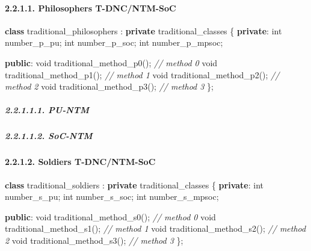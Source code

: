 \documentclass[
]{article}
\newenvironment{Shaded}{}{}
\newcommand{\CommentTok}[1]{\textcolor[rgb]{0.38,0.63,0.69}{\textit{#1}}}
\newcommand{\DataTypeTok}[1]{\textcolor[rgb]{0.56,0.13,0.00}{#1}}
\newcommand{\KeywordTok}[1]{\textcolor[rgb]{0.00,0.44,0.13}{\textbf{#1}}}
\newcommand{\NormalTok}[1]{#1}
\begin{document}
\hypertarget{philosophers-t-dncntm-soc}{%
\paragraph{2.2.1.1. Philosophers
T-DNC/NTM-SoC}\label{philosophers-t-dncntm-soc}}

\begin{Shaded}
\begin{Highlighting}[]
\KeywordTok{class}\NormalTok{ traditional\_philosophers : }\KeywordTok{private}\NormalTok{ traditional\_classes \{}
   \KeywordTok{private}\NormalTok{:}
      \DataTypeTok{int}\NormalTok{ number\_p\_pu;}
      \DataTypeTok{int}\NormalTok{ number\_p\_soc;}
      \DataTypeTok{int}\NormalTok{ number\_p\_mpsoc;}

   \KeywordTok{public}\NormalTok{:}
      \DataTypeTok{void}\NormalTok{ traditional\_method\_p0();  }\CommentTok{// method 0}
      \DataTypeTok{void}\NormalTok{ traditional\_method\_p1();  }\CommentTok{// method 1}
      \DataTypeTok{void}\NormalTok{ traditional\_method\_p2();  }\CommentTok{// method 2}
      \DataTypeTok{void}\NormalTok{ traditional\_method\_p3();  }\CommentTok{// method 3}
\NormalTok{\};}
\end{Highlighting}
\end{Shaded}

\hypertarget{pu-ntm}{%
\subparagraph{2.2.1.1.1. PU-NTM}\label{pu-ntm}}

\hypertarget{soc-ntm}{%
\subparagraph{2.2.1.1.2. SoC-NTM}\label{soc-ntm}}

\hypertarget{soldiers-t-dncntm-soc}{%
\paragraph{2.2.1.2. Soldiers
T-DNC/NTM-SoC}\label{soldiers-t-dncntm-soc}}

\begin{Shaded}
\begin{Highlighting}[]
\KeywordTok{class}\NormalTok{ traditional\_soldiers : }\KeywordTok{private}\NormalTok{ traditional\_classes \{}
   \KeywordTok{private}\NormalTok{:}
      \DataTypeTok{int}\NormalTok{ number\_s\_pu;}
      \DataTypeTok{int}\NormalTok{ number\_s\_soc;}
      \DataTypeTok{int}\NormalTok{ number\_s\_mpsoc;}

   \KeywordTok{public}\NormalTok{:}
      \DataTypeTok{void}\NormalTok{ traditional\_method\_s0();  }\CommentTok{// method 0}
      \DataTypeTok{void}\NormalTok{ traditional\_method\_s1();  }\CommentTok{// method 1}
      \DataTypeTok{void}\NormalTok{ traditional\_method\_s2();  }\CommentTok{// method 2}
      \DataTypeTok{void}\NormalTok{ traditional\_method\_s3();  }\CommentTok{// method 3}
\NormalTok{\};}
\end{Highlighting}
\end{Shaded}
\end{document}
